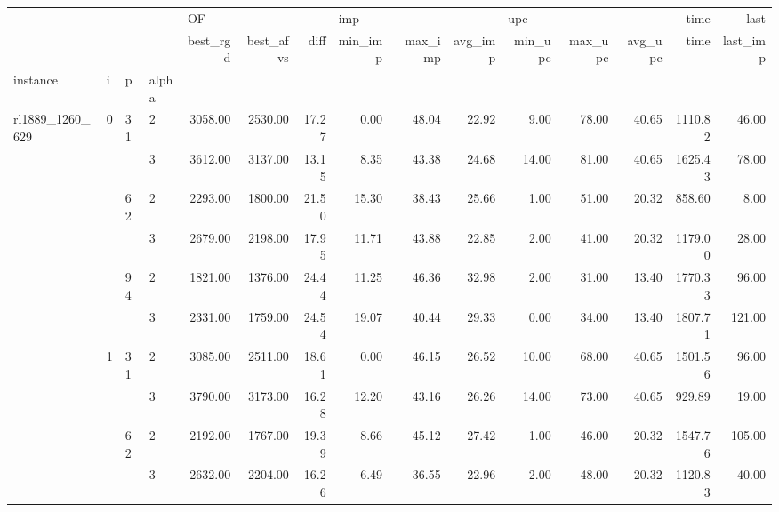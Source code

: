 \begin{tabular}{llllrrrrrrrrrrr}
\toprule
                &   &    &   & \multicolumn{3}{l}{OF} & \multicolumn{3}{l}{imp} & \multicolumn{3}{l}{upc} &    time &     last \\
                &   &    &   & best\_rgd & best\_afvs &  diff & min\_imp & max\_imp & avg\_imp & min\_upc & max\_upc & avg\_upc &    time & last\_imp \\
instance & i & p & alpha &          &           &       &         &         &         &         &         &         &         &          \\
\midrule
\multirow{60}{*}{rl1889\_1260\_629} & \multirow{6}{*}{0} & \multirow{2}{*}{31} & 2 &  3058.00 &   2530.00 & 17.27 &    0.00 &   48.04 &   22.92 &    9.00 &   78.00 &   40.65 & 1110.82 &    46.00 \\
                &   &    & 3 &  3612.00 &   3137.00 & 13.15 &    8.35 &   43.38 &   24.68 &   14.00 &   81.00 &   40.65 & 1625.43 &    78.00 \\
\cline{3-15}
                &   & \multirow{2}{*}{62} & 2 &  2293.00 &   1800.00 & 21.50 &   15.30 &   38.43 &   25.66 &    1.00 &   51.00 &   20.32 &  858.60 &     8.00 \\
                &   &    & 3 &  2679.00 &   2198.00 & 17.95 &   11.71 &   43.88 &   22.85 &    2.00 &   41.00 &   20.32 & 1179.00 &    28.00 \\
\cline{3-15}
                &   & \multirow{2}{*}{94} & 2 &  1821.00 &   1376.00 & 24.44 &   11.25 &   46.36 &   32.98 &    2.00 &   31.00 &   13.40 & 1770.33 &    96.00 \\
                &   &    & 3 &  2331.00 &   1759.00 & 24.54 &   19.07 &   40.44 &   29.33 &    0.00 &   34.00 &   13.40 & 1807.71 &   121.00 \\
\cline{2-15}
\cline{3-15}
                & \multirow{6}{*}{1} & \multirow{2}{*}{31} & 2 &  3085.00 &   2511.00 & 18.61 &    0.00 &   46.15 &   26.52 &   10.00 &   68.00 &   40.65 & 1501.56 &    96.00 \\
                &   &    & 3 &  3790.00 &   3173.00 & 16.28 &   12.20 &   43.16 &   26.26 &   14.00 &   73.00 &   40.65 &  929.89 &    19.00 \\
\cline{3-15}
                &   & \multirow{2}{*}{62} & 2 &  2192.00 &   1767.00 & 19.39 &    8.66 &   45.12 &   27.42 &    1.00 &   46.00 &   20.32 & 1547.76 &   105.00 \\
                &   &    & 3 &  2632.00 &   2204.00 & 16.26 &    6.49 &   36.55 &   22.96 &    2.00 &   48.00 &   20.32 & 1120.83 &    40.00 \\

\end{tabular}
